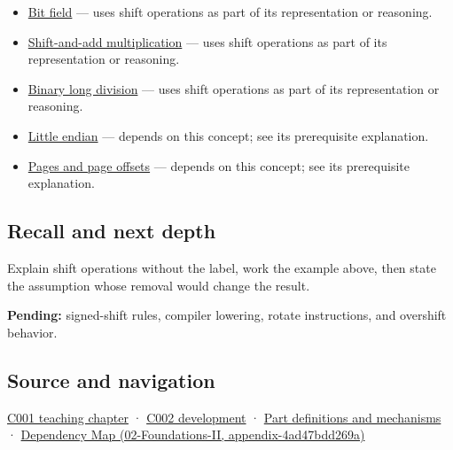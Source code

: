 \begin{itemize}
\item
  \hyperref[appendix-ac697f5c66e8]{Bit field} --- uses shift operations as part of its representation or reasoning.
\item
  \hyperref[appendix-a65290d66ed9]{Shift-and-add multiplication} --- uses shift operations as part of its representation or reasoning.
\item
  \hyperref[appendix-89985e6a2685]{Binary long division} --- uses shift operations as part of its representation or reasoning.
\item
  \hyperref[appendix-367b6abf460e]{Little endian} --- depends on this concept; see its prerequisite explanation.
\item
  \hyperref[appendix-0c67cd5bf30a]{Pages and page offsets} --- depends on this concept; see its prerequisite explanation.
\end{itemize}

\subsection{Recall and next depth}\label{recall-and-next-depth}

Explain shift operations without the label, work the example above, then state the assumption whose removal would change the result.

\textbf{Pending:} signed-shift rules, compiler lowering, rotate instructions, and overshift behavior.

\subsection{Source and navigation}\label{source-and-navigation}

\href{Continuous\%20Notes/Computing\%20Foundations\%20-\%20From\%20Bits\%20to\%20C++\%20and\%20Systems\%20APIs\#From\%20a\%20signal\%20to\%20an\%20interpretation}{C001 teaching chapter} · \href{Continuous\%20Notes/Computing\%20Foundations\%20-\%20From\%20Bits\%20to\%20C++\%20and\%20Systems\%20APIs\#Arithmetic\%20becomes\%20a\%20policy}{C002 development} · \hyperref[appendix-fd090d982a15]{Part definitions and mechanisms} · \href{}{Dependency Map (02-Foundations-II, appendix-4ad47bdd269a)}
